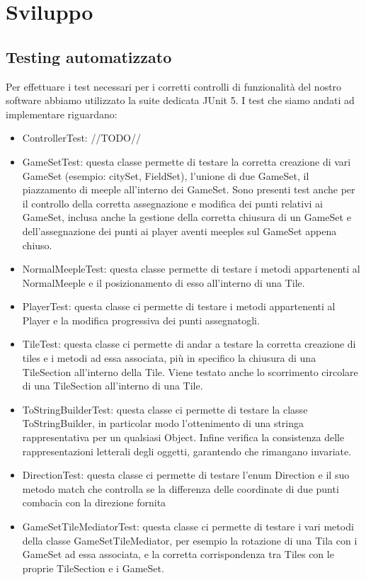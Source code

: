 \section{Sviluppo}
\subsection{Testing automatizzato}
Per effettuare i test necessari per i corretti controlli di funzionalità del nostro software abbiamo utilizzato la suite dedicata JUnit 5. I test che siamo andati ad implementare riguardano:
\begin{itemize}
    \item ControllerTest: //TODO//
    \item GameSetTest: questa classe permette di testare la corretta creazione di vari GameSet (esempio: citySet, FieldSet), l'unione di due GameSet, il piazzamento di meeple all'interno dei GameSet. Sono presenti test anche per il controllo della corretta assegnazione e modifica dei punti relativi ai GameSet, inclusa anche la gestione della corretta chiusura di un GameSet e dell'assegnazione dei punti ai player aventi meeples sul GameSet appena chiuso.
    \item NormalMeepleTest: questa classe permette di testare i metodi appartenenti al NormalMeeple e il posizionamento di esso all'interno di una Tile.
    \item PlayerTest: questa classe ci permette di testare i metodi appartenenti al Player e la modifica progressiva dei punti assegnatogli.
    \item TileTest: questa classe ci permette di andar a testare la corretta creazione di tiles e i metodi ad essa associata, più in specifico la chiusura di una TileSection all'interno della Tile. Viene testato anche lo scorrimento circolare di una TileSection all'interno di una Tile.
    \item ToStringBuilderTest: questa classe ci permette di testare la classe ToStringBuilder, in particolar modo l'ottenimento di una stringa rappresentativa per un qualsiasi Object. Infine verifica la consistenza delle rappresentazioni letterali degli oggetti, garantendo che rimangano invariate.
    \item DirectionTest: questa classe ci permette di testare l'enum Direction e il suo metodo match che controlla se la differenza delle coordinate di due punti combacia con la direzione fornita
    \item GameSetTileMediatorTest: questa classe ci permette di testare i vari metodi della classe GameSetTileMediator, per esempio la rotazione di una Tila con i GameSet ad essa associata, e la corretta corrispondenza tra Tiles con le proprie TileSection e i GameSet.
\end{itemize}


